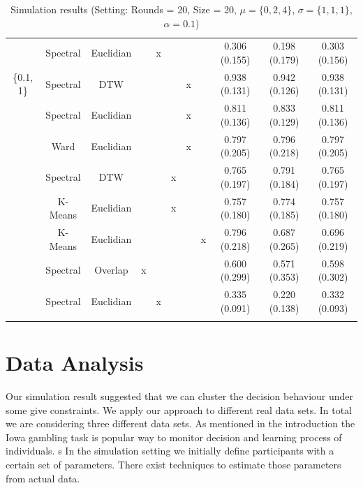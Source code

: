 \documentclass[12pt,a4paper,bibliography=totocnumbered,listof=totocnumbered]{scrartcl}
\begin{document}
\begin{table}[!htbp]
\begin{tabularx}{\textwidth}{ ccccccccccc}
		& Spectral & Euclidian &  & x &  &  &  & 0.306 (0.155) & 0.198 (0.179) & 0.303 (0.156) \\ 
		\{0.1, 1\} & Spectral & DTW &  &  &  & x &  & 0.938 (0.131) & 0.942 (0.126) & 0.938 (0.131) \\ 
		& Spectral & Euclidian &  &  &  & x &  & 0.811 (0.136) & 0.833 (0.129) & 0.811 (0.136) \\ 
		& Ward  & Euclidian &  &  &  & x &  & 0.797 (0.205) & 0.796 (0.218) & 0.797 (0.205) \\ 
		& Spectral & DTW &  &  & x &  &  & 0.765 (0.197) & 0.791 (0.184) & 0.765 (0.197) \\ 
		& K-Means & Euclidian &  &  & x &  &  & 0.757 (0.180) & 0.774 (0.185) & 0.757 (0.180) \\ 
		& K-Means & Euclidian &  &  &  &  & x & 0.796 (0.218) & 0.687 (0.265) & 0.696 (0.219) \\ 
		& Spectral & Overlap & x &  &  &  &  & 0.600 (0.299) & 0.571 (0.353) & 0.598 (0.302) \\ 
		& Spectral & Euclidian &  & x &  &  &  & 0.335 (0.091) & 0.220 (0.138) & 0.332 (0.093) \\ 
		\hline \\
	\end{tabularx} 
	\caption{Simulation results (Setting: Rounds = 20, Size = 20, $\mu = \{0,2,4\}$, $\sigma =  \{1,1,1\}$, $\alpha = 0.1$)} 
\end{table} 









\section{Data Analysis}

Our simulation result suggested that we can cluster the decision behaviour under some give constraints. We apply our approach to different real data sets. In total we are considering three different data sets. As mentioned in the introduction the Iowa gambling task is popular way to monitor decision and learning process of individuals. s
In the simulation setting we initially define participants with a certain set of parameters. There exist techniques to estimate those parameters from actual data. 
\end{document}
